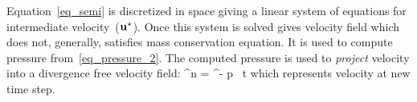 Equation~\ref{eq_semi} is discretized in space giving a linear system
of equations for intermediate velocity~(${\bf u}^\star$). Once this
system is solved gives velocity field which does not, generally, 
satisfies mass conservation equation. It is used to compute pressure 
from~\ref{eq_pressure_2}. The computed pressure is used to {\em project}
velocity into a divergence free velocity field:
%
\be
  \uvw^{n} = \uvw^\s -  \nabla p \, \Delta t
  \label{eq_projection}
\ee
%
which represents velocity at new time step. 



